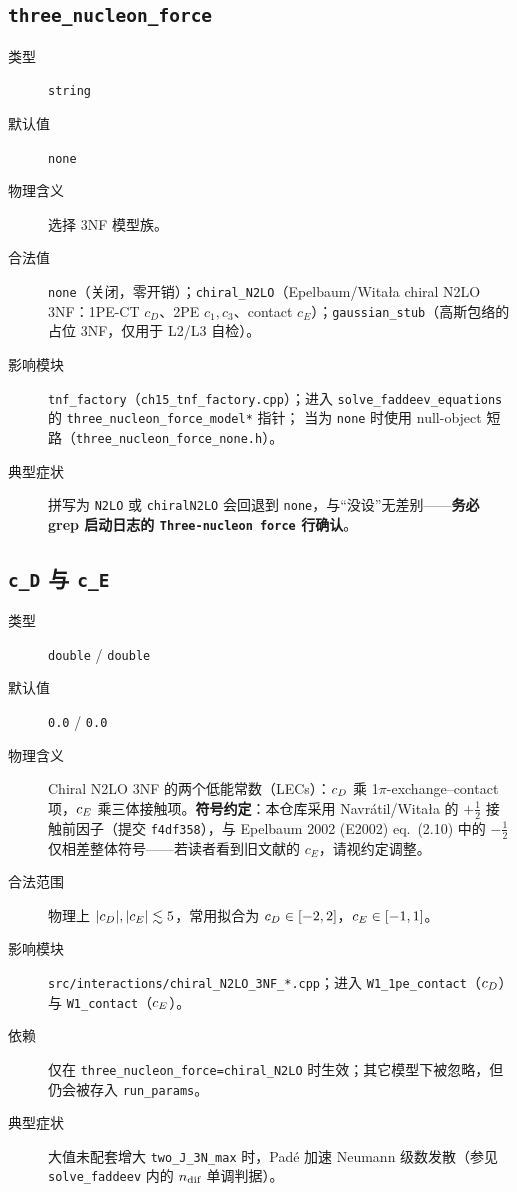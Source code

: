 \subsection{\texttt{three\_nucleon\_force}}

\begin{description}
  \item[类型] \texttt{string}
  \item[默认值] \texttt{none}
  \item[物理含义] 选择 3NF 模型族。
  \item[合法值] \texttt{none}（关闭，零开销）；\texttt{chiral\_N2LO}（Epelbaum/Witała chiral N2LO 3NF：1PE-CT \(c_D\)、2PE \(c_1,c_3\)、contact \(c_E\)）；\texttt{gaussian\_stub}（高斯包络的占位 3NF，仅用于 L2/L3 自检）。
  \item[影响模块] \texttt{tnf\_factory}（\texttt{ch15\_tnf\_factory.cpp}）；进入 \texttt{solve\_faddeev\_equations} 的 \texttt{three\_nucleon\_force\_model*} 指针；
        当为 \texttt{none} 时使用 null-object 短路（\texttt{three\_nucleon\_force\_none.h}）。
  \item[典型症状] 拼写为 \texttt{N2LO} 或 \texttt{chiralN2LO} 会回退到 \texttt{none}，与“没设”无差别——\textbf{务必 grep 启动日志的 \texttt{Three-nucleon force} 行确认}。
\end{description}

\subsection{\texttt{c\_D} 与 \texttt{c\_E}}

\begin{description}
  \item[类型] \texttt{double} / \texttt{double}
  \item[默认值] \texttt{0.0} / \texttt{0.0}
  \item[物理含义] Chiral N2LO 3NF 的两个低能常数（LECs）：\(c_D\) 乘 1\(\pi\)-exchange–contact 项，\(c_E\) 乘三体接触项。\textbf{符号约定}：本仓库采用
        Navrátil/Witała 的 \(+\tfrac12\) 接触前因子（提交 \texttt{f4df358}），与 Epelbaum 2002 (E2002) eq.~(2.10) 中的 \(-\tfrac12\) 仅相差整体符号——若读者看到旧文献的 \(c_E\)，请视约定调整。
  \item[合法范围] 物理上 \(|c_D|,|c_E|\lesssim 5\)，常用拟合为 \(c_D\in[-2,2]\)，\(c_E\in[-1,1]\)。
  \item[影响模块] \texttt{src/interactions/chiral\_N2LO\_3NF\_*.cpp}；进入 \texttt{W1\_1pe\_contact}（\(c_D\)）与 \texttt{W1\_contact}（\(c_E\)）。
  \item[依赖] 仅在 \texttt{three\_nucleon\_force=chiral\_N2LO} 时生效；其它模型下被忽略，但仍会被存入 \texttt{run\_params}。
  \item[典型症状] 大值未配套增大 \texttt{two\_J\_3N\_max} 时，Padé 加速 Neumann 级数发散（参见 \texttt{solve\_faddeev} 内的 \(n_{\text{dif}}\) 单调判据）。
\end{description}

